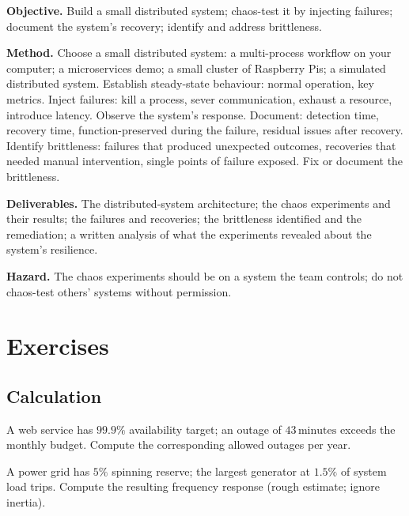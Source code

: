 \begin{project}
\textbf{Objective.} Build a small distributed system; chaos-test it by injecting failures; document the system's recovery; identify and address brittleness.

\textbf{Method.} Choose a small distributed system: a multi-process workflow on your computer; a microservices demo; a small cluster of Raspberry Pis; a simulated distributed system. Establish steady-state behaviour: normal operation, key metrics. Inject failures: kill a process, sever communication, exhaust a resource, introduce latency. Observe the system's response. Document: detection time, recovery time, function-preserved during the failure, residual issues after recovery. Identify brittleness: failures that produced unexpected outcomes, recoveries that needed manual intervention, single points of failure exposed. Fix or document the brittleness.

\textbf{Deliverables.} The distributed-system architecture; the chaos experiments and their results; the failures and recoveries; the brittleness identified and the remediation; a written analysis of what the experiments revealed about the system's resilience.

\textbf{Hazard.} The chaos experiments should be on a system the team controls; do not chaos-test others' systems without permission.
\end{project}

\section{Exercises}

\subsection*{Calculation}

\begin{exercise}
A web service has $99.9\%$ availability target; an outage of $43\,\text{minutes}$ exceeds the monthly budget. Compute the corresponding allowed outages per year.
\end{exercise}

\begin{exercise}
A power grid has $5\%$ spinning reserve; the largest generator at $1.5\%$ of system load trips. Compute the resulting frequency response (rough estimate; ignore inertia).
\end{exercise}

